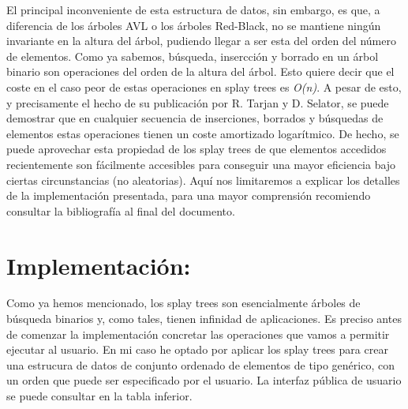 \documentclass[letterpaper,12pt]{article}
\begin{document}
El principal inconveniente de esta estructura de datos, sin embargo, es que, 
a diferencia de los árboles AVL o los árboles Red-Black, no se mantiene 
ningún invariante en la altura del árbol, pudiendo llegar a ser esta del 
orden del número de elementos. Como ya sabemos, búsqueda, insercción y 
borrado en un árbol binario son operaciones del orden de la altura del árbol.
Esto quiere decir que el coste en el caso peor de estas operaciones en splay 
trees es \textit{O(n)}. A pesar de esto, y precisamente el hecho de su 
publicación por R. Tarjan y D. Selator, se puede demostrar que en cualquier 
secuencia de inserciones, borrados y búsquedas de elementos estas operaciones
tienen un coste amortizado logarítmico. De hecho, se puede aprovechar esta 
propiedad de los splay trees de que elementos accedidos recientemente son 
fácilmente accesibles para conseguir una mayor eficiencia bajo ciertas 
circunstancias (no aleatorias). Aquí nos limitaremos a explicar los detalles 
de la implementación presentada, para una mayor comprensión recomiendo 
consultar la bibliografía al final del documento.


\section{Implementación:}

Como ya hemos mencionado, los splay trees son esencialmente árboles de
búsqueda binarios y, como tales, tienen infinidad de aplicaciones. Es preciso
antes de comenzar la implementación concretar las operaciones que vamos a 
permitir ejecutar al usuario. En mi caso he optado por aplicar los splay 
trees para crear una estrucura de datos de conjunto ordenado de elementos de
tipo genérico, con un orden que puede ser especificado por el usuario.
La interfaz pública de usuario se puede consultar en la tabla inferior.
\end{document}
